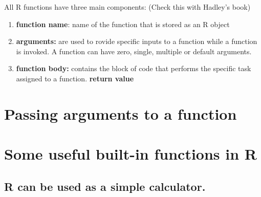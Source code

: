 \documentclass[
]{book}
\begin{document}
All R functions have three main components: (Check this with Hadley's book)

\begin{enumerate}
\def\labelenumi{\arabic{enumi}.}
\item
  \textbf{function name}: name of the function that is stored as an R object
\item
  \textbf{arguments:} are used to rovide specific inputs to a function while a function is invoked. A function can have zero, single, multiple or default arguments.
\item
  \textbf{function body:} contains the block of code that performs the specific task assigned to a function. \textbf{return value}
\end{enumerate}

\hypertarget{passing-arguments-to-a-function}{%
\section{Passing arguments to a function}\label{passing-arguments-to-a-function}}

\hypertarget{some-useful-built-in-functions-in-r}{%
\section{Some useful built-in functions in R}\label{some-useful-built-in-functions-in-r}}

\hypertarget{r-can-be-used-as-a-simple-calculator.}{%
\subsection{R can be used as a simple calculator.}\label{r-can-be-used-as-a-simple-calculator.}}
\end{document}
